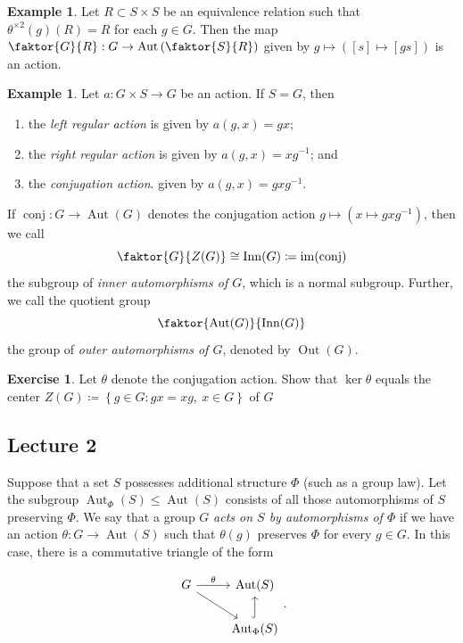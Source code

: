 \documentclass[10pt,letterpaper,cm]{nupset}
\theoremstyle{definition}
\newtheorem{exmp}[definition]{Example}
\theoremstyle{theorem}
\newtheorem{exercise}[definition]{Exercise}
\theoremstyle{remark}
\newcommand{\1}{\mathbf{1}}
\newcommand{\0}{\vec 0}
\DeclareMathOperator{\aut}{Aut}
\DeclareMathOperator{\inn}{Inn}
\DeclareMathOperator{\out}{Out}
\DeclareMathOperator{\im}{im}
\DeclareMathOperator{\conj}{conj}
\begin{document}
\begin{exmp}
Let $R\subset S \times S$ be an equivalence relation such that $\theta^{\times 2}(g)(R) = R$ for each $g 
\in G$. Then the map $\faktor{G}{R}: G \to \aut\left(\faktor{S}{R}\right)$ given by $g \mapsto \left([s] \mapsto [gs]\right)$ is an action.
\end{exmp}

\begin{exmp}
Let $a : G \times S \to G$ be an action. If $S = G$, then 
\begin{enumerate}[label=(\alph*)]
\item the \textit{left regular action} is given by $a(g, x) = gx$; 
\item the \textit{right regular action} is given by $a(g, x) = xg^{-1}$; and 
\item the \textit{conjugation action}. given by $a(g, x) = gx g^{-1}$.
\end{enumerate}
\end{exmp}

\smallskip

If $\conj: G \to \aut(G)$ denotes the conjugation action $g \mapsto \left(x\mapsto gxg^{-1}\right)$, then we call $$\faktor{G}{Z(G)} \cong  \inn(G)\coloneqq  \im(\conj)$$ the subgroup of \textit{inner automorphisms of $G$}, which is a normal subgroup. Further, we call the quotient group $$\faktor{\aut(G)}{\inn(G)}$$ the group of \textit{outer automorphisms of $G$}, denoted by $\out(G)$.

\begin{exercise}
Let $\theta$ denote the conjugation action. Show that $\ker{\theta}$ equals the center $Z(G)\coloneqq \left\{g\in G: gx=xg, \ x\in G\right\}$ of $G$
\end{exercise}



\subsection{Lecture 2}

Suppose that a set $S$ possesses additional structure $\Phi$ (such as a group law). Let the subgroup $\aut_{\Phi}(S) \leq \aut(S)$ consists of all those automorphisms of $S$ preserving $\Phi$. We say that a group $G$ \textit{acts on $S$ by automorphisms of $\Phi$} if we have an action $\theta : G\to \aut(S)$ such that $\theta(g)$ preserves $\Phi$ for every $g\in G$.  In this case, there is a commutative triangle of the form

\[ 
\begin{tikzcd}
G \arrow{r}{\theta} \arrow[swap]{dr} & \aut(S) \\%
 & \aut_{\Phi}(S) \arrow[hookrightarrow]{u}
\end{tikzcd}.
\]
\end{document}
